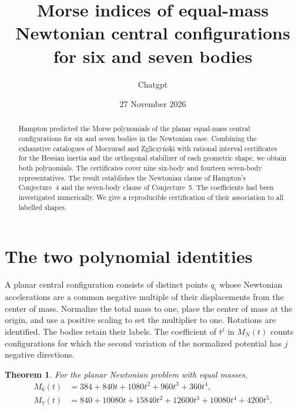 \documentclass[10pt]{article}
\title{Morse indices of equal-mass Newtonian central configurations\\for six and seven bodies}
\author{Chatgpt}
\date{27 November 2026}
\newtheorem{theorem}{Theorem}
\begin{document}
\maketitle

\begin{abstract}
Hampton predicted the Morse polynomials of the planar equal-mass central configurations for six and seven bodies in the Newtonian case. Combining the exhaustive catalogues of Moczurad and Zgliczyński with rational interval certificates for the Hessian inertia and the orthogonal stabilizer of each geometric shape, we obtain both polynomials. The certificates cover nine six-body and fourteen seven-body representatives. The result establishes the Newtonian clause of Hampton's Conjecture~4 and the seven-body clause of Conjecture~5. The coefficients had been investigated numerically. We give a reproducible certification of their association to all labelled shapes.
\end{abstract}

\section{The two polynomial identities}
A planar central configuration consists of distinct points $q_i$ whose Newtonian accelerations are a common negative multiple of their displacements from the center of mass. Normalize the total mass to one, place the center of mass at the origin, and use a positive scaling to set the multiplier to one. Rotations are identified. The bodies retain their labels. The coefficient of $t^j$ in $M_N(t)$ counts configurations for which the second variation of the normalized potential has $j$ negative directions.

\begin{theorem}
For the planar Newtonian problem with equal masses,
\begin{align*}
M_6(t)&=384+840t+1080t^2+960t^3+360t^4,\\
M_7(t)&=840+10080t+15840t^2+12600t^3+10080t^4+4200t^5.
\end{align*}
\end{theorem}
\end{document}
